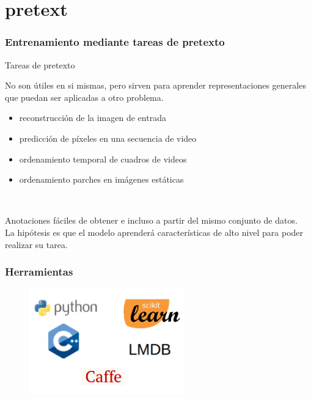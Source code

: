 \documentclass{beamer}
\begin{document}
\section{pretext}
\begin{frame}
\frametitle{Entrenamiento mediante tareas de pretexto}
Tareas de pretexto \\\vfill

No son útiles en si mismas, pero sirven para aprender representaciones generales que puedan ser aplicadas a otro problema.\\\vfill
	
\begin{itemize}
    \item reconstrucción de la imagen de entrada
    \item predicción de píxeles en una secuencia de video 
    \item ordenamiento temporal de cuadros de videos
    \item ordenamiento parches en imágenes estáticas
\end{itemize}\\
\vfill

Anotaciones fáciles de obtener e incluso a partir del mismo conjunto de datos. \\
\vfill
La hipótesis es que el modelo aprenderá características de alto nivel para poder realizar su tarea.
\vfill
\end{frame}








\begin{frame}
\frametitle{Herramientas}
\begin{figure}
    \centering
    \includegraphics[width=0.6\textwidth]{images/tools.png}
\end{figure}
\end{frame}
\end{document}
